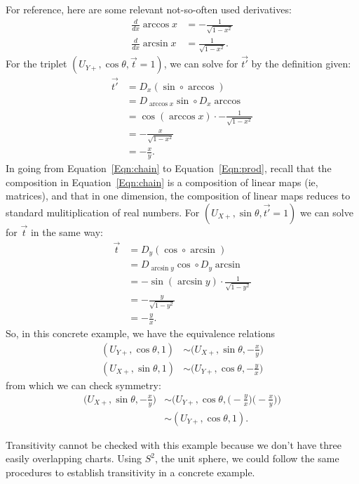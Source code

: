 \documentclass[11pt]{article}
\begin{document}
For reference, here are some relevant  not-so-often used derivatives:
\begin{align}
  \frac{d}{dx}\arccos x &= -\frac{1}{\sqrt{1 - x^2}} \\
  \frac{d}{dx}\arcsin x &= \frac{1}{\sqrt{1 - x^2}}.
\end{align}
For the triplet $(U_{Y+}, \cos\theta, \vec{t}=1)$, we can solve for $\vec{t'}$ by
the definition given:
\begin{align}
  \vec{t'} &= D_x(\sin \circ \arccos) \\
  &= D_{\arccos x}\sin \circ D_x \arccos              \label{Eqn:chain} \\
  &= \cos(\arccos x) \cdot -\frac{1}{\sqrt{1 - x^2}} \label{Eqn:prod} \\
  &= -\frac{x}{\sqrt{1 - x^2}} \\
  &= -\frac{x}{y}.
\end{align}
In going from Equation~\ref{Eqn:chain} to Equation~\ref{Eqn:prod}, recall that
the composition in Equation~\ref{Eqn:chain} is a composition of linear maps (ie,
matrices), and that in one dimension, the composition of linear maps reduces to
standard mulitiplication of real numbers.  For $(U_{X+}, \sin\theta,
\vec{t'}=1)$ we can solve for $\vec{t}$ in the same way:
\begin{align}
  \vec{t} &= D_y(\cos \circ \arcsin) \\
  &= D_{\arcsin y}\cos \circ D_y \arcsin \\
  &= -\sin(\arcsin y) \cdot \frac{1}{\sqrt{1 - y^2}} \\
  &= -\frac{y}{\sqrt{1 - y^2}} \\
  &= -\frac{y}{x}.
\end{align}
So, in this concrete example, we have the equivalence relations
\begin{align}
  (U_{Y+}, \cos\theta, 1) &\sim \bigg(U_{X+}, \sin\theta, -\frac{x}{y}\bigg) \\
  (U_{X+}, \sin\theta, 1) &\sim \bigg(U_{Y+}, \cos\theta, -\frac{y}{x}\bigg)
\end{align}
from which we can check symmetry:
\begin{align}
    \bigg(U_{X+}, \sin\theta, -\frac{x}{y}\bigg) &\sim \bigg(U_{Y+}, \cos\theta, \bigg(-\frac{y}{x}\bigg)\bigg(-\frac{x}{y}\bigg)\bigg) \\
&\sim (U_{Y+}, \cos\theta, 1).
\end{align}

Transitivity cannot be checked with this example because we don't have three
easily overlapping charts.  Using $S^2$, the unit sphere, we could follow the
same procedures to establish transitivity in a concrete example.
\end{document}
